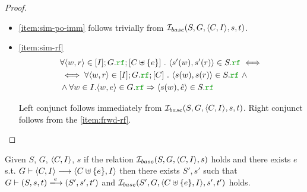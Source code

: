 \documentclass[12pt]{article}
\begin{document}
\begin{proof}
\begin{itemize}
  \item \ref{item:sim-po-imm} follows trivially from $\mathcal{I}_{base}(S, G, \langle C, I \rangle, s, t)$.
    
  \item \ref{item:sim-rf} \\
    
    \begin{equation*}
      \begin{split}
        & \forall{\tup{w, r} \in [I];G.\lRF;[C \uplus \{e\}]} ~.~
          \tup{s'(w), s'(r)} \in S.\lRF \iff \\
        & \iff \forall{\tup{w, r} \in [I];G.\lRF;[C]} ~.~ \tup{s(w), s(r)} \in S.\lRF ~ \wedge \\
        & \wedge \forall{w \in I}. \tup{w, e} \in G.\lRF \Rightarrow \tup{s(w), \hat{e}} \in S.\lRF
      \end{split}
    \end{equation*}

    Left conjunct follows immediately from $\mathcal{I}_{base}(S, G, \langle C, I \rangle, s, t)$.
    Right conjunct follows from the \ref{item:frwd-rf}.
    
  \end{itemize}
  
\end{proof}

\begin{lemma}
  Given $S$, $G$, $\langle C, I \rangle$, $s$
  if the relation $\mathcal{I}_{base}(S, G, \langle C, I \rangle, s)$ holds and
  there exists $e$ s.t. $G \vdash \langle C, I \rangle \longrightarrow \langle C \uplus \{e\}, I \rangle$ then
  there exists $S', s'$ such that
  $G \vdash (S, s, t) \ESstep{e} (S', s', t')$
  and $\mathcal{I}_{base}(S', G, \langle C \uplus \{e\}, I \rangle, s', t')$ holds.
\end{lemma}
\end{document}
